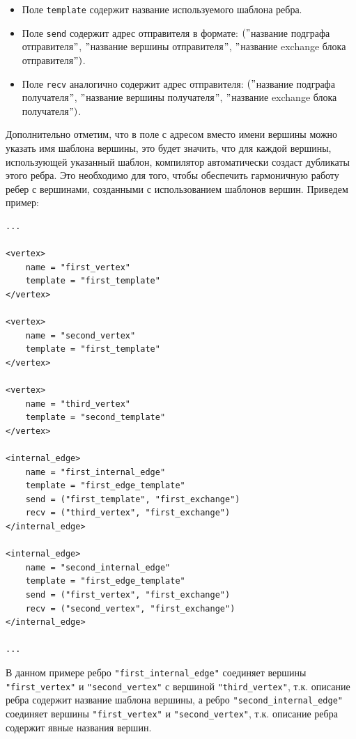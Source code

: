 \documentclass[a4paper, 12pt]{article}
\begin{document}
\begin{itemize}
	\item Поле \lstinline$template$ содержит название используемого шаблона ребра.
	\item Поле \lstinline$send$ содержит адрес отправителя в формате: $("$название подграфа отправителя$"$, $"$название вершины отправителя$"$, $"$название exchange блока отправителя$")$.
	\item Поле \lstinline$recv$ аналогично содержит адрес отправителя: $("$название подграфа получателя$"$, $"$название вершины получателя$"$, $"$название exchange блока получателя$")$.
\end{itemize}
Дополнительно отметим, что в поле с адресом вместо имени вершины можно указать имя шаблона вершины, это будет значить, что для каждой вершины, использующей указанный шаблон, компилятор автоматически создаст дубликаты этого ребра. Это необходимо для того, чтобы обеспечить гармоничную работу ребер с вершинами, созданными с использованием шаблонов вершин. Приведем пример:
\begin{lstlisting}
...

<vertex>
	name = "first_vertex"
	template = "first_template"
</vertex>

<vertex>
	name = "second_vertex"
	template = "first_template"
</vertex>

<vertex>
	name = "third_vertex"
	template = "second_template"
</vertex>

<internal_edge>
	name = "first_internal_edge"
	template = "first_edge_template"
	send = ("first_template", "first_exchange")
	recv = ("third_vertex", "first_exchange")
</internal_edge>

<internal_edge>
	name = "second_internal_edge"
	template = "first_edge_template"
	send = ("first_vertex", "first_exchange")
	recv = ("second_vertex", "first_exchange")
</internal_edge>

...
\end{lstlisting}
В данном примере ребро \lstinline$"first_internal_edge"$ соединяет вершины \lstinline$"first_vertex"$ и \lstinline$"second_vertex"$ с вершиной \lstinline$"third_vertex"$, т.к. описание ребра содержит название шаблона вершины, а ребро \lstinline$"second_internal_edge"$ соединяет вершины \lstinline$"first_vertex"$ и \lstinline$"second_vertex"$, т.к. описание ребра содержит явные названия вершин.
\end{document}
